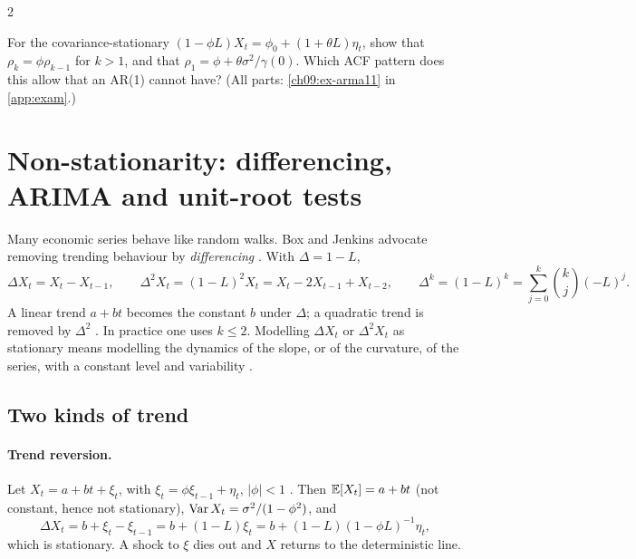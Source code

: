 \begin{paracol}{2}
\begin{exercise}\label{ch09:ex-arma11-short}
For the covariance-stationary $(1-\phi L)X_t=\phi_0+(1+\theta L)\eta_t$, show that $\rho_k=\phi\rho_{k-1}$ for $k>1$, and that $\rho_1=\phi+\theta\sigma^2/\gamma(0)$. Which ACF pattern does this allow that an AR(1) cannot have? (All parts: \cref{ch09:ex-arma11} in \cref{app:exam}.)
\end{exercise}

\section{Non-stationarity: differencing, ARIMA and unit-root tests}\label{ch09:sec-nonstat}

Many economic series behave like random walks. Box and Jenkins advocate removing trending behaviour by
\emph{differencing} . With $\Delta=1-L$,
\[
  \Delta X_t=X_t-X_{t-1},\qquad
  \Delta^2X_t=(1-L)^2X_t=X_t-2X_{t-1}+X_{t-2},\qquad
  \Delta^k=(1-L)^k=\sum_{j=0}^k\binom kj(-L)^j .
\]
A linear trend $a+bt$ becomes the constant $b$ under $\Delta$; a quadratic trend is removed by $\Delta^2$
. In practice one uses $k\le2$. Modelling $\Delta X_t$ or $\Delta^2X_t$ as stationary
means modelling the dynamics of the slope, or of the curvature, of the series, with a constant level and variability
.

\subsection{Two kinds of trend}\label{ch09:sec-trends}
\paragraph{Trend reversion.} Let $X_t=a+bt+\xi_t$, with $\xi_t=\phi\xi_{t-1}+\eta_t$, $|\phi|<1$
. Then $\mathbb{E}[X_t]=a+bt$ (not constant, hence not stationary), $\operatorname{Var} X_t=\sigma^2/(1-\phi^2)$, and
\[
  \Delta X_t=b+\xi_t-\xi_{t-1}=b+(1-L)\xi_t=b+(1-L)(1-\phi L)^{-1}\eta_t,
\]
which is stationary. A shock to $\xi$ dies out and $X$ returns to the deterministic line.


\end{paracol}
